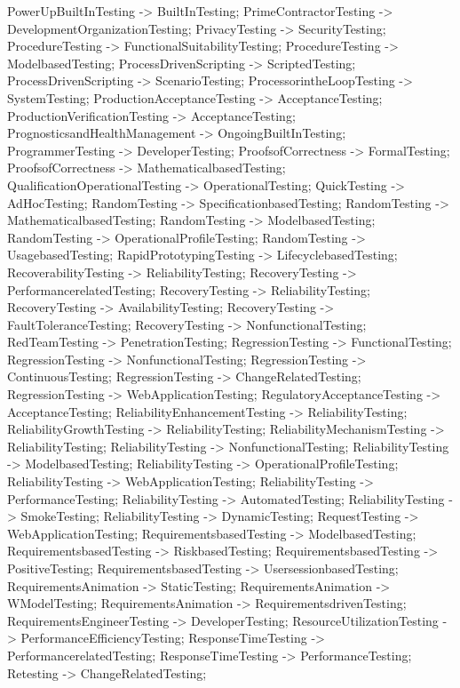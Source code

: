 \documentclass{article}
\begin{document}
{PowerUpBuiltInTesting -> BuiltInTesting;
PrimeContractorTesting -> DevelopmentOrganizationTesting;
PrivacyTesting -> SecurityTesting;
ProcedureTesting -> FunctionalSuitabilityTesting;
ProcedureTesting -> ModelbasedTesting;
ProcessDrivenScripting -> ScriptedTesting;
ProcessDrivenScripting -> ScenarioTesting;
ProcessorintheLoopTesting -> SystemTesting;
ProductionAcceptanceTesting -> AcceptanceTesting;
ProductionVerificationTesting -> AcceptanceTesting;
PrognosticsandHealthManagement -> OngoingBuiltInTesting;
ProgrammerTesting -> DeveloperTesting;
ProofsofCorrectness -> FormalTesting;
ProofsofCorrectness -> MathematicalbasedTesting;
QualificationOperationalTesting -> OperationalTesting;
QuickTesting -> AdHocTesting;
RandomTesting -> SpecificationbasedTesting;
RandomTesting -> MathematicalbasedTesting;
RandomTesting -> ModelbasedTesting;
RandomTesting -> OperationalProfileTesting;
RandomTesting -> UsagebasedTesting;
RapidPrototypingTesting -> LifecyclebasedTesting;
RecoverabilityTesting -> ReliabilityTesting;
RecoveryTesting -> PerformancerelatedTesting;
RecoveryTesting -> ReliabilityTesting;
RecoveryTesting -> AvailabilityTesting;
RecoveryTesting -> FaultToleranceTesting;
RecoveryTesting -> NonfunctionalTesting;
RedTeamTesting -> PenetrationTesting;
RegressionTesting -> FunctionalTesting;
RegressionTesting -> NonfunctionalTesting;
RegressionTesting -> ContinuousTesting;
RegressionTesting -> ChangeRelatedTesting;
RegressionTesting -> WebApplicationTesting;
RegulatoryAcceptanceTesting -> AcceptanceTesting;
ReliabilityEnhancementTesting -> ReliabilityTesting;
ReliabilityGrowthTesting -> ReliabilityTesting;
ReliabilityMechanismTesting -> ReliabilityTesting;
ReliabilityTesting -> NonfunctionalTesting;
ReliabilityTesting -> ModelbasedTesting;
ReliabilityTesting -> OperationalProfileTesting;
ReliabilityTesting -> WebApplicationTesting;
ReliabilityTesting -> PerformanceTesting;
ReliabilityTesting -> AutomatedTesting;
ReliabilityTesting -> SmokeTesting;
ReliabilityTesting -> DynamicTesting;
RequestTesting -> WebApplicationTesting;
RequirementsbasedTesting -> ModelbasedTesting;
RequirementsbasedTesting -> RiskbasedTesting;
RequirementsbasedTesting -> PositiveTesting;
RequirementsbasedTesting -> UsersessionbasedTesting;
RequirementsAnimation -> StaticTesting;
RequirementsAnimation -> WModelTesting;
RequirementsAnimation -> RequirementsdrivenTesting;
RequirementsEngineerTesting -> DeveloperTesting;
ResourceUtilizationTesting -> PerformanceEfficiencyTesting;
ResponseTimeTesting -> PerformancerelatedTesting;
ResponseTimeTesting -> PerformanceTesting;
Retesting -> ChangeRelatedTesting;
}
\end{document}
